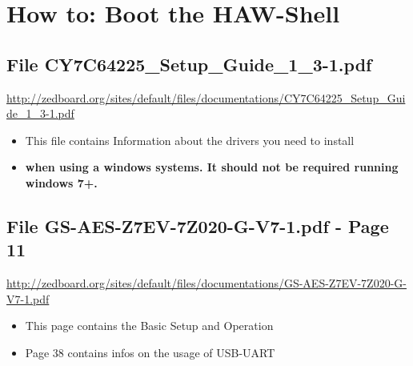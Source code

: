 \documentclass[a4paper, oneside]{scrreprt}
\begin{document}
\chapter{How to: Boot the HAW-Shell}
\section{File CY7C64225\_Setup\_Guide\_1\_3-1.pdf}
\url{http://zedboard.org/sites/default/files/documentations/CY7C64225_Setup_Guide_1_3-1.pdf}
\begin{itemize}
\item This file contains Information about the drivers you need to install
\item \textbf{when using a windows systems. It should not be required running windows 7+.}
\end{itemize}

\section{File GS-AES-Z7EV-7Z020-G-V7-1.pdf - Page 11}
\url{http://zedboard.org/sites/default/files/documentations/GS-AES-Z7EV-7Z020-G-V7-1.pdf}
\begin{itemize}
\item This page contains the Basic Setup and Operation
\item Page 38 contains infos on the usage of USB-UART
\end{itemize}
\end{document}
